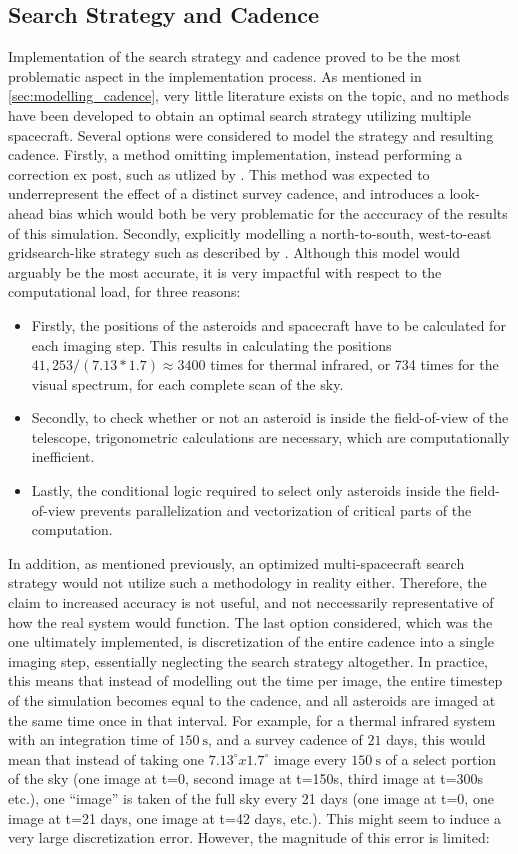 \subsection{Search Strategy and Cadence}
Implementation of the search strategy and cadence proved to be the most problematic aspect in the implementation process. As mentioned in \autoref{sec:modelling_cadence}, very little literature exists on the topic, and no methods have been developed to obtain an optimal search strategy utilizing multiple spacecraft. Several options were considered to model the strategy and resulting cadence. Firstly, a method omitting implementation, instead performing a correction ex post, such as utlized by \cite{ThesisOlga}. This method was expected to underrepresent the effect of a distinct survey cadence, and introduces a look-ahead bias which would both be very problematic for the acccuracy of the results of this simulation. Secondly, explicitly modelling a north-to-south, west-to-east gridsearch-like strategy such as described by \cite{NEOCam}. Although this model would arguably be the most accurate, it is very impactful with respect to the computational load, for three reasons:
\begin{itemize}
 \item Firstly, the positions of the asteroids and spacecraft have to be calculated for each imaging step. This results in calculating the positions $41,253 / (7.13*1.7) \approx 3400$ times for thermal infrared, or 734 times for the visual spectrum, for each complete scan of the sky.
 \item Secondly, to check whether or not an asteroid is inside the field-of-view of the telescope, trigonometric calculations are necessary, which are computationally inefficient.
 \item Lastly, the conditional logic required to select only asteroids inside the field-of-view prevents parallelization and vectorization of critical parts of the computation.
\end{itemize}
In addition, as mentioned previously, an optimized multi-spacecraft search strategy would not utilize such a methodology in reality either. Therefore, the claim to increased accuracy is not useful, and not neccessarily representative of how the real system would function. The last option considered, which was the one ultimately implemented, is discretization of the entire cadence into a single imaging step, essentially neglecting the search strategy altogether. In practice, this means that instead of modelling out the time per image, the entire timestep of the simulation becomes equal to the cadence, and all asteroids are imaged at the same time once in that interval. For example, for a thermal infrared system with an integration time of $150~\mathrm{s}$, and a survey cadence of $21$ days, this would mean that instead of taking one $7.13^\circ x1.7^\circ$ image every $150~\mathrm{s}$ of a select portion of the sky (one image at t=0, second image at t=150s, third image at t=300s etc.), one ``image'' is taken of the full sky every 21 days (one image at t=0, one image at t=21 days, one image at t=42 days, etc.). This might seem to induce a very large discretization error. However, the magnitude of this error is limited:
